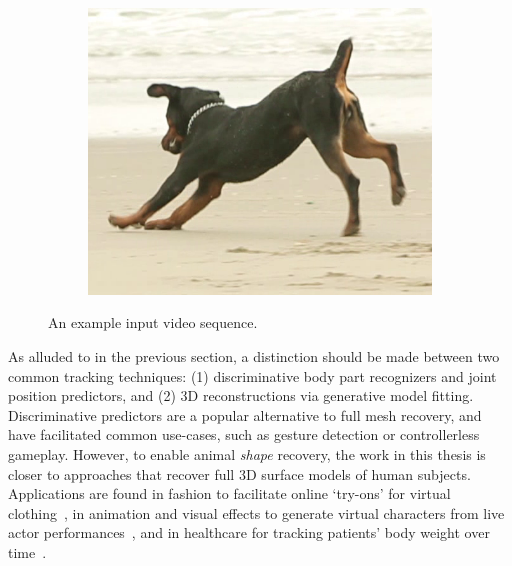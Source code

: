 \begin{figure}[t]
\begin{subfigure}{0.33\textwidth}
    \centering
        \includegraphics[width=1\linewidth]{input/208}
    \end{subfigure}%
    \caption{An example input video sequence.}
    \label{fig:arap_input}
\end{figure}

    

As alluded to in the previous section, a distinction should be made between two common tracking techniques: (1) discriminative body part recognizers and joint position predictors, and (2) 3D reconstructions via generative model fitting. Discriminative predictors are a popular alternative to full mesh recovery, and have facilitated common use-cases, such as gesture detection or controllerless gameplay. However, to enable animal \emph{shape} recovery, the work in this thesis is closer to approaches that recover full 3D surface models of human subjects. Applications are found in fashion to facilitate online `try-ons' for virtual clothing~\cite{lin2014digital}, in animation and visual effects to generate virtual characters from live actor performances~\cite{laine2017production}, and in healthcare for tracking patients' body weight over time~\cite{velardo2010weight}. 

